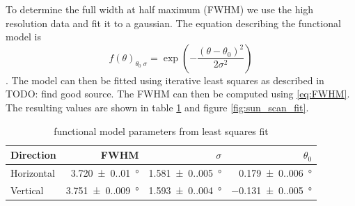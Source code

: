 To determine the full width at half maximum (FWHM) we use the high resolution data and fit it to a gaussian.
The equation describing the functional model is
\begin{equation}
    f(\theta)_{\theta_0\;\sigma} = \exp{\left(-\frac{(\theta-\theta_0)^2}{2\sigma^2}\right)}
\end{equation}.
The model can then be fitted using iterative least squares as described in TODO: find good source. The FWHM can then be computed using \eqref{eq:FWHM}.
The resulting values are shown in table \ref{tab:params} and figure \ref{fig:sun_scan_fit}.
\begin{table}[H]
    \centering
    \begin{tabular}{lrrr}
        \toprule
        Direction & FWHM & $ \sigma $ & $ \theta_0 $\\
        \midrule
        Horizontal & \SI{3.720(0.010)}{\degree} & \SI{1.581(0.005)}{\degree} & \SI{0.179(0.006)}{\degree} \\
        Vertical & \SI{3.751(0.009)}{\degree} & \SI{1.593(0.004)}{\degree} & \SI{-0.131(0.005)}{\degree} \\
        \bottomrule
    \end{tabular}
    \caption{functional model parameters from least squares fit}
    \label{tab:params}
\end{table}
